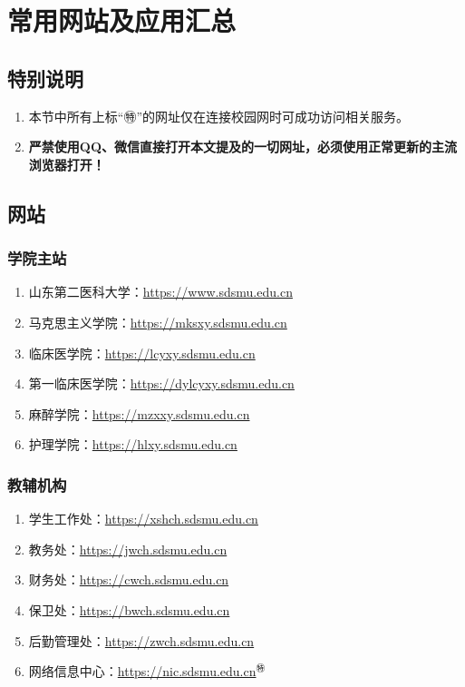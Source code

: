 \chapter[常用网站及应用汇总]{常用网站及应用汇总}

\section*{特别说明}
\begin{enumerate}
    \item 本节中所有上标“㊕”的网址仅在连接校园网时可成功访问相关服务。
    \item \textbf{严禁使用QQ、微信直接打开本文提及的一切网址，必须使用正常更新的主流浏览器打开！}
\end{enumerate}

\section[网站]{网站}
\subsection[学院主站]{学院主站}
\begin{enumerate}
    \item 山东第二医科大学：\href{https://www.sdsmu.edu.cn}{https://www.sdsmu.edu.cn}
    \item 马克思主义学院：\href{https://mksxy.sdsmu.edu.cn}{https://mksxy.sdsmu.edu.cn}
    \item 临床医学院：\href{https://lcyxy.sdsmu.edu.cn}{https://lcyxy.sdsmu.edu.cn}
    \item 第一临床医学院：\href{https://dylcyxy.sdsmu.edu.cn}{https://dylcyxy.sdsmu.edu.cn}
    \item 麻醉学院：\href{https://mzxxy.sdsmu.edu.cn}{https://mzxxy.sdsmu.edu.cn}
    \item 护理学院：\href{https://hlxy.sdsmu.edu.cn}{https://hlxy.sdsmu.edu.cn}
\end{enumerate}

\subsection[教辅机构]{教辅机构}
\begin{enumerate}
    \item 学生工作处：\href{https://xshch.sdsmu.edu.cn}{https://xshch.sdsmu.edu.cn}
    \item 教务处：\href{https://jwch.sdsmu.edu.cn}{https://jwch.sdsmu.edu.cn}
    \item 财务处：\href{https://cwch.sdsmu.edu.cn}{https://cwch.sdsmu.edu.cn}
    \item 保卫处：\href{https://bwch.sdsmu.edu.cn}{https://bwch.sdsmu.edu.cn}
    \item 后勤管理处：\href{https://zwch.sdsmu.edu.cn}{https://zwch.sdsmu.edu.cn}
    \item 网络信息中心：\href{https://nic.sdsmu.edu.cn}{https://nic.sdsmu.edu.cn$^㊕$}
\end{enumerate}

